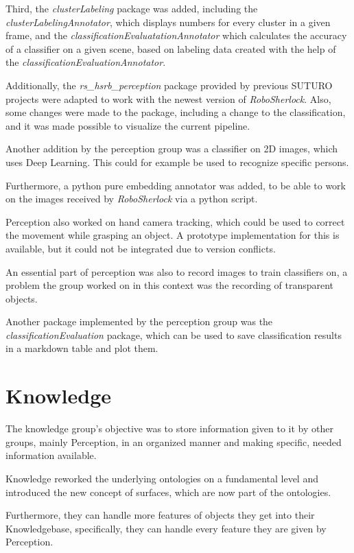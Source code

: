 \documentclass[main.tex]{subfiles}
\begin{document}
		Third, the \textit{clusterLabeling} package was added, including the \textit{clusterLabelingAnnotator}, which displays numbers for every cluster in a given frame, and the \textit{classificationEvaluatationAnnotator} which calculates the accuracy of a classifier on a given scene, based on labeling data created with the help of the \textit{classificationEvaluationAnnotator}. 
		
		Additionally, the \textit{rs\_hsrb\_perception} package provided by previous SUTURO projects were adapted to work with the newest version of \textit{RoboSherlock}. Also, some changes were made to the package, including a change to the classification, and it was made possible to visualize the current pipeline.
		
		Another addition by the perception group was a classifier on 2D images, which uses Deep Learning. This could for example be used to recognize specific persons.
		
		Furthermore, a python pure embedding annotator was added, to be able to work on the images received by \textit{RoboSherlock} via a python script.
		
		Perception also worked on hand camera tracking, which could be used to correct the movement while grasping an object. A prototype implementation for this is available, but it could not be integrated due to version conflicts. 
		
		An essential part of perception was also to record images to train classifiers on, a problem the group worked on in this context was the recording of transparent objects.
		
		Another package implemented by the perception group was the \textit{classificationEvaluation} package, which can be used to save classification results in a markdown table and plot them.
		
		
		
		
		\section{Knowledge}
		The knowledge group's objective was to store information given to it by other groups, mainly Perception, in an organized manner and making specific, needed information available.
		
		Knowledge reworked the underlying ontologies on a fundamental level and introduced the new concept of surfaces, which are now part of the ontologies.
		
		Furthermore, they can handle more features of objects they get into their Knowledgebase, specifically, they can handle every feature they are given by Perception.
		
\end{document}
